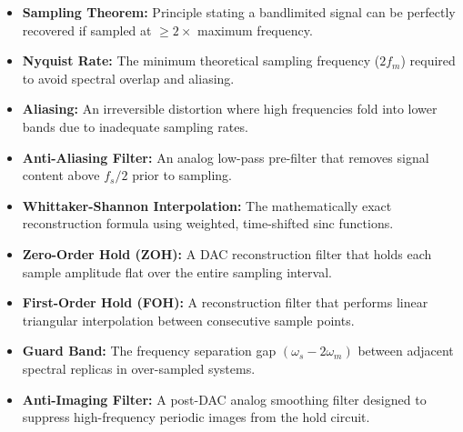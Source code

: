 \documentclass[12pt,a4paper]{article}
\begin{document}
\begin{tcolorbox}[defbox, title={\textbf{One-Line Definitions}}]
\begin{itemize}[leftmargin=*, itemsep=2pt, topsep=0pt]
  \item \textbf{Sampling Theorem:} Principle stating a bandlimited signal can be perfectly recovered if sampled at $\ge 2\times$ maximum frequency.
  \item \textbf{Nyquist Rate:} The minimum theoretical sampling frequency ($2f_m$) required to avoid spectral overlap and aliasing.
  \item \textbf{Aliasing:} An irreversible distortion where high frequencies fold into lower bands due to inadequate sampling rates.
  \item \textbf{Anti-Aliasing Filter:} An analog low-pass pre-filter that removes signal content above $f_s/2$ prior to sampling.
  \item \textbf{Whittaker-Shannon Interpolation:} The mathematically exact reconstruction formula using weighted, time-shifted sinc functions.
  \item \textbf{Zero-Order Hold (ZOH):} A DAC reconstruction filter that holds each sample amplitude flat over the entire sampling interval.
  \item \textbf{First-Order Hold (FOH):} A reconstruction filter that performs linear triangular interpolation between consecutive sample points.
  \item \textbf{Guard Band:} The frequency separation gap $(\omega_s - 2\omega_m)$ between adjacent spectral replicas in over-sampled systems.
  \item \textbf{Anti-Imaging Filter:} A post-DAC analog smoothing filter designed to suppress high-frequency periodic images from the hold circuit.
\end{itemize}
\end{tcolorbox}
\end{document}
